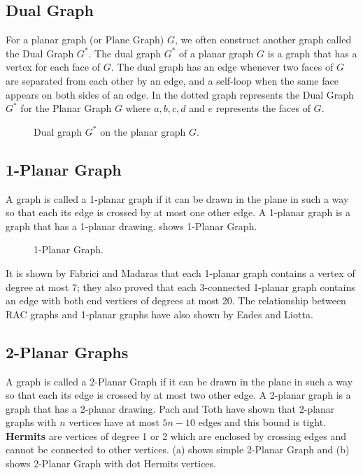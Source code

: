 \subsection{Dual Graph}
For a planar graph (or Plane Graph) $G$, we often construct another graph 
called the Dual Graph $G^{*}$. The dual graph $G^{*}$ of a planar graph $G$ is a graph that has a vertex for each face of $G$. The dual graph has an edge whenever two faces of $G$ are separated from each other by an edge, and a self-loop when the same face appears on both sides of an edge. In  the dotted graph represents the Dual Graph $G^{*}$ for the Planar Graph $G$ where $a,b,c,d$ and $e$ represents the faces of $G$.

\begin{figure}[!tb]
  \centering
\resizebox{70mm}{!}{}
\caption{Dual graph $G^{*}$ on the planar graph $G$.}
\label{fig:dual_graph}
\end{figure}



\subsection{1-Planar Graph}

A graph is called a 1-planar graph if it can be drawn in the plane in such a way so that each its edge is crossed by at most one other edge. A 1-planar graph is a graph that has a 1-planar drawing.  shows 1-Planar Graph.
\\


\begin{figure}[!tb]
 \centering
\resizebox{50mm}{!}{}
\caption{1-Planar Graph.}
\label{fig:1p}
\end{figure}


It is shown by Fabrici and Madaras  \cite{madaras} that each 1-planar graph contains a vertex of degree at most 7; they also proved that each 3-connected 1-planar graph contains an edge with both end vertices of degrees at most 20. The relationship between RAC graphs and 1-planar graphs \cite{p} have also shown by Eades and Liotta.



\subsection{2-Planar Graphs}

A graph is called a 2-Planar Graph if it can be drawn in the plane in such a way so that each its edge is crossed by at most two other edge. A 2-planar graph is a graph that has a 2-planar drawing.
Pach and Toth have shown that 2-planar graphs with $n$ vertices have at most $5n-10$ edges and this bound is tight.
\\
\textbf{Hermits} are vertices of degree 1 or 2 which are enclosed by crossing edges and cannot be connected to other vertices.  (a) shows simple 2-Planar Graph and (b) shows 2-Planar Graph with dot Hermits vertices.


